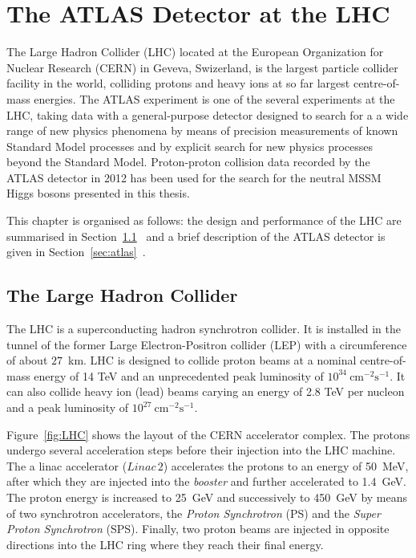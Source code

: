 \chapter{The ATLAS Detector at the LHC}\label{chap:detector}
 \vspace{0.5cm}

The Large Hadron Collider (LHC) located at the European Organization for Nuclear Research (CERN) in Geveva, Swizerland,
is  the largest particle collider facility in the world, colliding protons and heavy ions at so far largest centre-of-mass
energies. The ATLAS experiment is one of the several experiments 
at the LHC, taking data with a  general-purpose detector designed  to search for a a wide range of new 
physics phenomena by means of precision measurements of known Standard Model processes and by 
explicit search for new physics processes beyond the Standard Model. 
Proton-proton collision data recorded by the ATLAS detector in 2012  has been used for 
the search for the neutral MSSM Higgs bosons presented in this thesis.

This chapter is organised as follows: the design and performance of the LHC  are summarised in 
Section~\ref{sec:lhc}~\cite{LHC} 
and  a brief description of the  ATLAS detector  is given 
in Section~\ref{sec:atlas}~\cite{ATLASDetector}.


\restoregeometry
\clearpage



\section{The Large Hadron Collider}\label{sec:lhc}
The LHC is a superconducting hadron synchrotron  collider. It is  installed in the tunnel of the former Large Electron-Positron collider (LEP)
with a circumference of about $27$~km.
LHC is designed to collide proton beams at a nominal centre-of-mass energy of 14 TeV and an unprecedented peak luminosity of 
$10^{34} ~ \text{cm}^{-2} \text{s}^{-1}$. It can also collide heavy ion (lead) beams carying  an energy of 2.8 TeV per nucleon and 
a peak luminosity of $10^{27} ~ \text{cm}^{-2} \text{s}^{-1}$. 

Figure~\ref{fig:LHC} shows the layout of the CERN accelerator complex. The  protons undergo several acceleration steps before 
their injection into the LHC machine.
The a linac accelerator ($Linac\,2$) accelerates the protons to an energy of 50~MeV, after which
they are injected into the \emph{booster} and further  accelerated
to 1.4~GeV. The proton energy is increased to 25~GeV and successively to 450~GeV by means of two synchrotron accelerators, the \emph{Proton Synchrotron} (PS)
and the \emph{Super Proton Synchrotron} (SPS). Finally, two proton beams are  injected in opposite directions into the LHC ring
where they reach their final energy.

